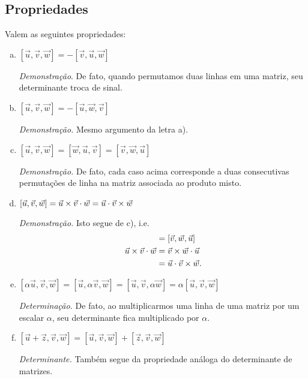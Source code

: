 \subsection{Propriedades}

Valem as seguintes propriedades:
\begin{enumerate}[a)]
\item {\color{blue}$[\vec{u},\vec{v},\vec{w}] = -[\vec{v},\vec{u},\vec{w}]$}

  {\it Demonstração}. De fato, quando permutamos duas linhas em uma matriz, seu determinante troca de sinal.
  
\item {\color{blue}$[\vec{u},\vec{v},\vec{w}] = -[\vec{u},\vec{w},\vec{v}]$}

  {\it Demonstração.} Mesmo argumento da letra a).
  
\item {\color{blue}$[\vec{u},\vec{v},\vec{w}] = [\vec{w},\vec{u},\vec{v}] = [\vec{v},\vec{w},\vec{u}]$}

  {\it Demonstração.} De fato, cada caso acima corresponde a duas consecutivas permutações de linha na matriz associada ao produto misto.
  
\item {\color{blue}$[\vec{u},\vec{v},\vec{w}] = \vec{u}\times\vec{v}\cdot\vec{w} = \vec{u}\cdot\vec{v}\times\vec{w}$}

  {\it Demonstração.} Isto segue de c), i.e.
  \begin{align}
    [\vec{u},\vec{v},\vec{w}] &= [\vec{v},\vec{w},\vec{u}] \\
    \vec{u}\cross\vec{v}\cdot\vec{w} &= \vec{v}\cross\vec{w}\cdot\vec{u}\\
                              &= \vec{u}\cdot\vec{v}\cross\vec{w}.
  \end{align}
  
\item {\color{blue}$[\alpha\vec{u},\vec{v},\vec{w}] = [\vec{u},\alpha\vec{v},\vec{w}]=[\vec{u},\vec{v},\alpha\vec{w}] = \alpha[\vec{u},\vec{v},\vec{w}]$}

  {\it Determinação.} De fato, ao multiplicarmos uma linha de uma matriz por um escalar $\alpha$, seu determinante fica multiplicado por $\alpha$.
  
\item {\color{blue}$[\vec{u}+\vec{z},\vec{v},\vec{w}] = [\vec{u},\vec{v},\vec{w}]+[\vec{z},\vec{v},\vec{w}]$}

  {\it Determinante.} Também segue da propriedade análoga do determinante de matrizes.
\end{enumerate}

